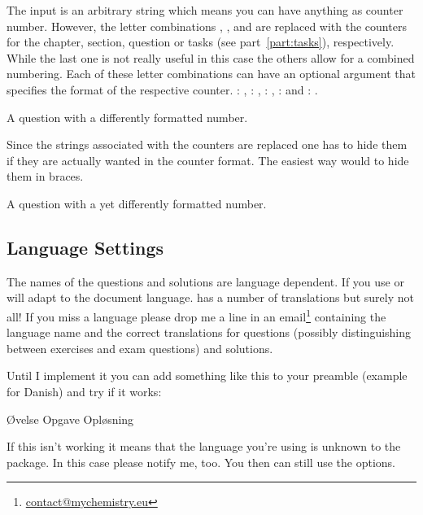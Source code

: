 \documentclass[DIV10,toc=index,toc=bib,numbers=noendperiod]{cnpkgdoc}
\begin{document}
The input is an arbitrary string which means you can have anything as counter
number.  However, the letter combinations , ,  and
 are replaced with the counters for the chapter, section, question
or tasks (see part~\ref{part:tasks}), respectively.  While the last one is not
really useful in this case the others allow for a combined numbering.  Each of
these letter combinations can have an optional argument that specifies the
format of the respective counter. : , :
, : , :  and :
.
\begin{beispiel}
 \begin{question}
  A question with a differently formatted number.
 \end{question}
\end{beispiel}
Since the strings associated with the counters are replaced one has to hide
them if they are actually wanted in the counter format.  The easiest way would
to hide them in braces.
\begin{beispiel}
 \begin{question}
  A question with a yet differently formatted number.
 \end{question}
\end{beispiel}

\subsection{Language Settings}
The names of the questions and solutions are language dependent.  If you use
 or  \ExSheets will adapt to the document
language.  \ExSheets has a number of translations but surely not all!  If you
miss a language please drop me a line in an
email\footnote{\href{mailto:contact@mychemistry.eu}{contact@mychemistry.eu}}
containing the  language name and the correct translations for
questions (possibly distinguishing between exercises and exam questions) and
solutions.

Until I implement it you can add something like this to your preamble (example
for Danish) and try if it works:
\begin{beispiel}
   {\O{}velse}
   {Opgave}
   {Opl\o{}sning}
\end{beispiel}
If this isn't working it means that the language you're using is unknown to
the  package.  In this case please notify me, too.  You
then can still use the  options.
\end{document}
